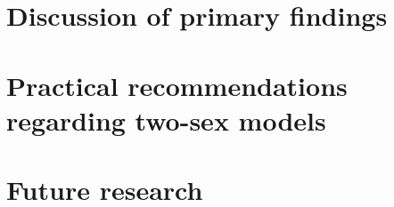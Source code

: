     \section{Discussion of primary findings}
      
    \section{Practical recommendations regarding two-sex models}
      
    \section{Future research}
      
      
\startappendices
 
 
 
 
 
 
 \nocite{*} %
\startbibliography
 \begin{singlespace} %
 \end{singlespace}


